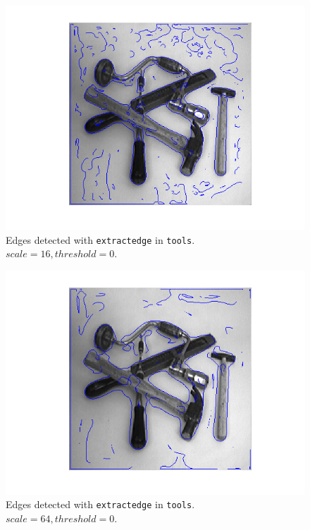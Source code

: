 \begin{figure}[H]
	\centering
	\includegraphics[scale=0.8]{./images/Q7/tools/16_0.png}
	\caption{Edges detected with \texttt{extractedge} in \texttt{tools}. $scale = 16, threshold = 0$.}
	\label{fig:Q7_tools_16_0}
\end{figure}

\begin{figure}[H]
	\centering
	\includegraphics[scale=0.8]{./images/Q7/tools/64_0.png}
	\caption{Edges detected with \texttt{extractedge} in \texttt{tools}. $scale = 64, threshold = 0$.}
	\label{fig:Q7_tools_64_0}
\end{figure}



